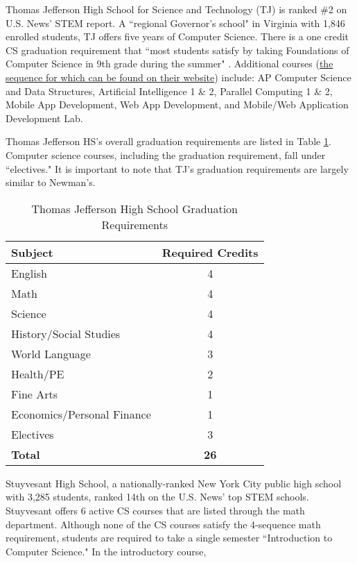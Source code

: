 Thomas Jefferson High School for Science and Technology (TJ) is ranked \#2 on U.S. News' STEM report. A ``regional Governor's school" in Virginia with 1,846 enrolled students, TJ offers five years of Computer Science. There is a one credit CS graduation requirement that ``most students satisfy by taking Foundations of Computer Science in 9th grade during the summer" \cite{tjreq}. Additional courses (\href{https://www.tjhsst.edu/research-academics/math-cs/computer-science/docs/FlowCS1516.pdf}{the sequence for which can be found on their website}) include: AP Computer Science and Data Structures, Artificial Intelligence 1 \& 2, Parallel Computing 1 \& 2, Mobile App Development, Web App Development, and Mobile/Web Application Development Lab.\par
Thomas Jefferson HS's overall graduation requirements are listed in Table \ref{tjtable}. Computer science courses, including the graduation requirement, fall under ``electives." It is important to note that TJ's graduation requirements are largely similar to Newman's. \par
\begin{table}[]
\centering
\caption{Thomas Jefferson High School Graduation Requirements \cite{tjreq}}
\label{tjtable}
\begin{tabular}{lc}
\textbf{Subject}       & \textbf{Required Credits} \\ \hline
English                & 4                     \\
Math                   & 4                     \\
Science                & 4                     \\
History/Social Studies & 4                     \\
World Language         & 3                     \\
Health/PE              & 2                     \\
Fine Arts              & 1                     \\
Economics/Personal Finance              & 1                     \\ 
Electives              & 3                     \\
\textbf{Total}         & \textbf{26}          
\end{tabular}
\end{table}
Stuyvesant High School, a nationally-ranked New York City public high school with 3,285 students, ranked 14th on the U.S. News' top STEM schools. Stuyvesant offers 6 active CS courses that are listed through the math department. Although none of the CS courses satisfy the 4-sequence math requirement, students are required to take a single semester ``Introduction to Computer Science." In the introductory course, 
